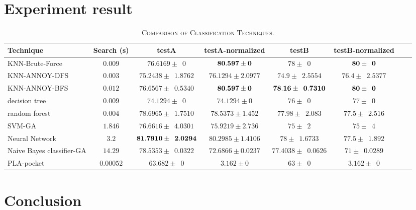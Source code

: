 \documentclass[twocolumn,10pt]{article}
\begin{document}
\section{Experiment result}
  \begin{table*}[htb]
    \newcommand{\z}{\phantom{0}}
    \caption{\textsc{Comparison of Classification Techniques.}}
      \vspace{-\baselineskip}
    \begin{tabular}{@{}lccccccl@{}}\toprule
    Technique & Search (s)       & testA                              & testA-normalized             & testB                          & testB-normalized \\ \midrule
    KNN-Brute-Force  & $0.009$   & $76.6169 \pm \z{0}$                & $\bf{80.597 \pm 0}$          & $78 \pm \z{0}$                 & $\bf{80 \pm \z{0}}$\\
    KNN-ANNOY-DFS    & $0.003$   & $75.2438 \pm \z{1.8762}$           & $76.1294 \pm 2.0977$         & $74.9 \pm \z{2.5554}$          & $76.4 \pm \z{2.5377}$\\
    KNN-ANNOY-BFS    & $0.012$   & $76.6567 \pm \z{0.5340}$           & $\bf{80.597 \pm 0}$          & $\bf{78.16 \pm \z{0.7310}}$    & $\bf{80 \pm \z{0}}$\\
    decision tree    & $0.009$   & $74.1294 \pm \z{0}$                & $74.1294 \pm 0$              & $76 \pm \z{0}$                 & $77 \pm \z{0}$\\
    random forest    & $0.004$   & $78.6965 \pm \z{1.7510}$           & $78.5373 \pm 1.452$          & $77.98 \pm \z{2.083}$          & $77.5 \pm \z{2.516}$\\
    SVM-GA           & $1.846$   & $76.6616 \pm \z{4.0301}$           & $75.9219 \pm 2.736$          & $75 \pm \z{2}$                 & $75 \pm \z{4}$\\
    Neural Network   & $3.2$     & $\bf{81.7910 \pm \z{2.0294}}$      & $80.2985 \pm 1.4106$         & $78 \pm \z{1.6733}$            & $77.5 \pm \z{1.892}$\\
    Naive Bayes classifier-GA  & $14.29$ & $78.5353 \pm \z{0.0322}$   & $72.6866 \pm 0.0237$         & $77.4038 \pm \z{0.0626}$       & $71 \pm \z{0.0289}$\\
    PLA-pocket       & $0.00052$ & $63.682 \pm \z{0}$                 & $3.162 \pm 0$                & $63 \pm \z{0}$                 & $3.162 \pm \z{0}$\\ \midrule
    \end{tabular}
    \label{table:overall}
      \vspace{-\baselineskip}
  \end{table*}
  
\section{Conclusion}



\end{document}
